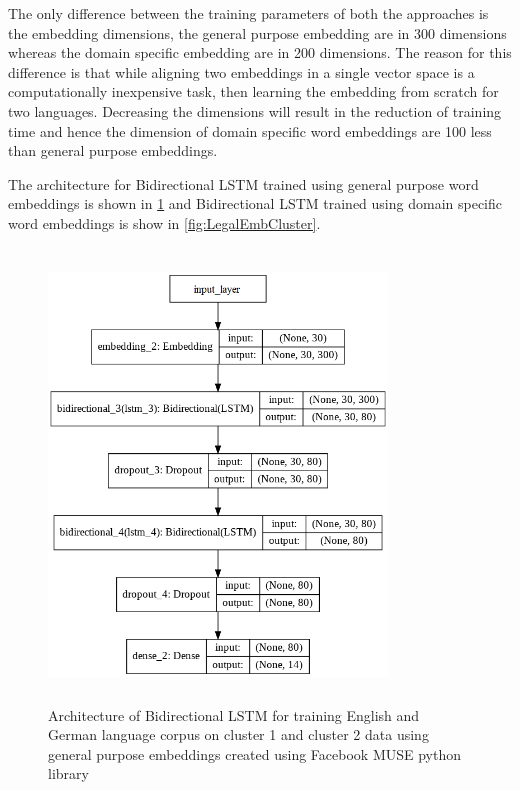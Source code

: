 The only difference between the training parameters of both the approaches is the embedding dimensions, the general purpose embedding are in 300 dimensions whereas the domain specific embedding are in 200 dimensions. The reason for this difference is that while aligning two embeddings in a single vector space is a computationally inexpensive task, then learning the embedding from scratch for two languages. Decreasing the dimensions will result in the reduction of training time and hence the dimension of domain specific word embeddings are 100 less than general purpose embeddings.

The architecture for Bidirectional LSTM trained using general purpose word embeddings is shown in \ref{fig:FBMuseCluster} and Bidirectional LSTM trained using domain specific word embeddings is show in \ref{fig:LegalEmbCluster}.

\begin{figure}[!ht]
    \centering
    \includegraphics[width=9cm, height=12cm]{pics/FBMUSE_Untrained_cluster_1.png}
    \captionsetup{justification=centering,margin=2cm}
    \caption{Architecture of Bidirectional LSTM for training English and German language corpus on cluster 1 and cluster 2 data using general purpose embeddings created using Facebook MUSE python library}
    \label{fig:FBMuseCluster}
\end{figure}



